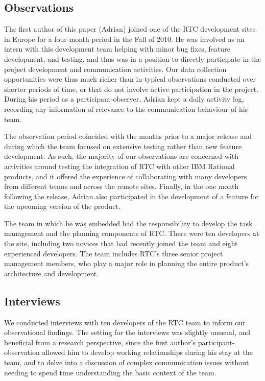 \subsection{Observations}
The first author of this paper (Adrian) joined one of the RTC development sites in Europe for a four-month period in the Fall of 2010. He was involved as an intern with this development team helping with minor bug fixes, feature development, and testing, and thus was in a position to directly participate in the project development and communication activities. Our data collection opportunities were thus much richer than in typical observations conducted over shorter periods of time, or that do not involve active participation in the project.  During his period as a participant-observer, Adrian kept a daily activity log, recording any information of relevance to the communication behaviour of his team.

The observation period coincided with the months prior to a major release and during which the team focused on extensive testing rather than new feature development. As such, the majority of our observations are concerned with activities around testing the integration of RTC with other IBM Rational products, and it offered the experience of collaborating with many developers from different teams and across the remote sites. Finally, in the one month following the release, Adrian also participated in the development of a feature for the upcoming version of the product.

The team in which he was embedded had the responsibility to develop the task management and the planning components of RTC. There were ten developers at the site, including two novices that had recently joined the team and eight experienced developers. The team includes RTC's three senior project management members, who play a major role in planning the entire product's architecture and development.

\subsection{Interviews}
We conducted interviews with ten developers of the RTC team to inform our observational findings. The setting for the interviews was slightly unusual, and beneficial from a research perspective, since the first author's participant-observation allowed him to develop working relationships during his stay at the team, and to delve into a discussion of complex communication issues without needing to spend time understanding the basic context of the team.

